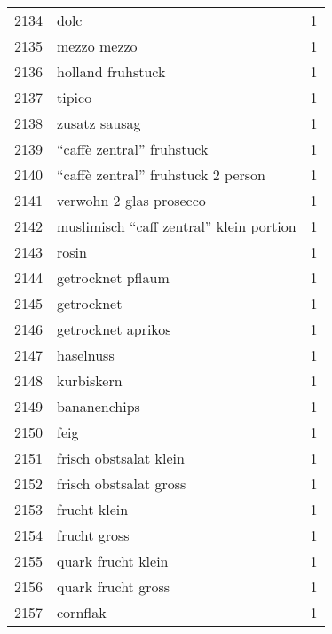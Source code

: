 \begin{tabular}{llr}
2134 &                                               dolc &      1 \\
2135 &                                        mezzo mezzo &      1 \\
2136 &                                  holland fruhstuck &      1 \\
2137 &                                             tipico &      1 \\
2138 &                                      zusatz sausag &      1 \\
2139 &                          “caffè zentral” fruhstuck &      1 \\
2140 &                 “caffè zentral” fruhstuck 2 person &      1 \\
2141 &                            verwohn 2 glas prosecco &      1 \\
2142 &            muslimisch “caff zentral” klein portion &      1 \\
2143 &                                              rosin &      1 \\
2144 &                                  getrocknet pflaum &      1 \\
2145 &                                         getrocknet &      1 \\
2146 &                                 getrocknet aprikos &      1 \\
2147 &                                          haselnuss &      1 \\
2148 &                                         kurbiskern &      1 \\
2149 &                                       bananenchips &      1 \\
2150 &                                               feig &      1 \\
2151 &                             frisch obstsalat klein &      1 \\
2152 &                             frisch obstsalat gross &      1 \\
2153 &                                       frucht klein &      1 \\
2154 &                                       frucht gross &      1 \\
2155 &                                 quark frucht klein &      1 \\
2156 &                                 quark frucht gross &      1 \\
2157 &                                           cornflak &      1 \\

\end{tabular}
